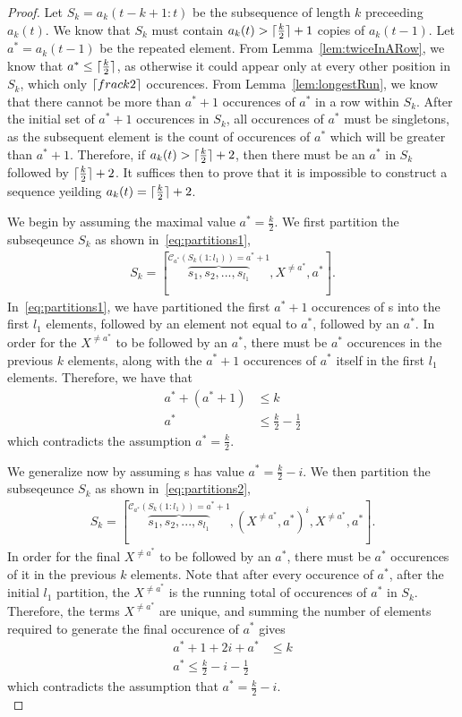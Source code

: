 \documentclass{article}
\DeclarePairedDelimiter\ceil{\lceil}{\rceil}
\begin{document}
\begin{proof}
Let $S_k = a_k(t-k+1:t)$ be the subsequence of length $k$ preceeding $a_k(t)$. We know that $S_k$ must contain $a_k(t) > \ceil{\frac{k}{2}}+1$ copies of $a_k(t-1)$. Let $a^*=a_k(t-1)$ be the repeated element. From Lemma~\ref{lem:twiceInARow}, we know that $a^*\leq \ceil{\frac{k}{2}}$, as otherwise it could appear only at every other position in $S_k$, which only $\ceil{frac{k}{2}}$ occurences. From Lemma~\ref{lem:longestRun}, we know that there cannot be more than $a^*+1$ occurences of $a^*$ in a row within $S_k$. After the initial set of $a^*+1$ occurences in $S_k$, all occurences of $a^*$ must be singletons, as the subsequent element is the count of occurences of $a^*$ which will be greater than $a^*+1$. Therefore, if $a_k(t)> \ceil{\frac{k}{2}}+2$, then there must be an $a^*$ in $S_k$ followed by $\ceil{\frac{k}{2}}+2$. It suffices then to prove that it is impossible to construct a sequence yeilding $a_k(t) = \ceil{\frac{k}{2}}+2$.

We begin by assuming the maximal value $a^* = \frac{k}{2}$. We first partition the subseqeunce $S_k$ as shown in~\eqref{eq:partitions1},
\begin{align}
S_k = [\overbrace{s_1,s_2,...,s_{l_1}}^{\mathcal{C}_{a^*}(S_k(1:l_1)) = a^*+1},X^{\neq a^*},a^*].\label{eq:partitions1}
\end{align}
In~\eqref{eq:partitions1}, we have partitioned the first $a^*+1$ occurences of s into the first $l_1$ elements, followed by an element not equal to $a^*$, followed by an $a^*$. In order for the $X^{\neq a^*}$ to be followed by an $a^*$, there must be $a^*$ occurences in the previous $k$ elements, along with the $a^*+1$ occurences of $a^*$ itself in the first $l_1$ elements. Therefore, we have that
\begin{align}
a^* + (a^*+1) &\leq k \\
a^* &\leq \frac{k}{2}-\frac{1}{2} 
\end{align}
which contradicts the assumption $a^*=\frac{k}{2}$. 

We generalize now by assuming s has value $a^* = \frac{k}{2}-i$. We then partition the subseqeunce $S_k$ as shown in~\eqref{eq:partitions2},
\begin{align}
S_k = [\overbrace{s_1,s_2,...,s_{l_1}}^{\mathcal{C}_{a^*}(S_k(1:l_1)) = a^*+1},(X^{\neq a^*},a^*)^{i},X^{\neq a^*},a^*].\label{eq:partitions2}
\end{align}
In order for the final $X^{\neq a^*}$ to be followed by an $a^*$, there must be $a^*$ occurences of it in the previous $k$ elements. Note that after every occurence of $a^*$, after the initial $l_1$ partition, the $X^{\neq a^*}$ is the running total of occurences of $a^*$ in $S_k$. Therefore, the terms $X^{\neq a^*}$ are unique, and summing the number of elements required to generate the final occurence of $a^*$ gives
\begin{align}
a^*+1+2i+a^* &\leq k\\
a^* \leq \frac{k}{2} - i - \frac{1}{2}
\end{align}
which contradicts the assumption that $a^* = \frac{k}{2}-i$.\\


\end{proof}
\end{document}
